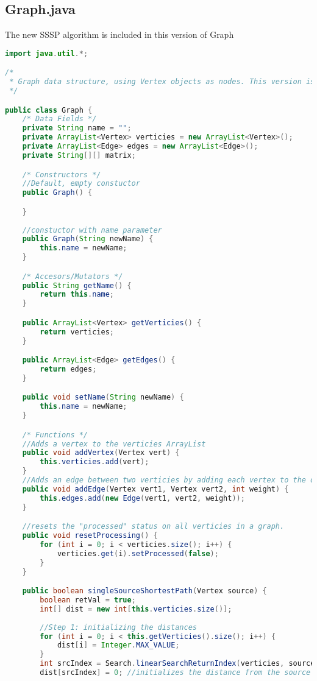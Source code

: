 \documentclass[letterpaper, 10pt,DIV=13]{scrartcl}
\numberwithin{equation}{section} %
\numberwithin{figure}{section} %
\numberwithin{table}{section} %
\begin{document}
\subsection{Graph.java}
The new SSSP algorithm is included in this version of Graph
\begin{lstlisting}[frame=single, language=java, breaklines]  
import java.util.*;

/*
 * Graph data structure, using Vertex objects as nodes. This version is for directed graphs
 */

public class Graph {
    /* Data Fields */
    private String name = "";
    private ArrayList<Vertex> verticies = new ArrayList<Vertex>();
    private ArrayList<Edge> edges = new ArrayList<Edge>();
    private String[][] matrix;

    /* Constructors */
    //Default, empty constuctor
    public Graph() {

    }
    
    //constuctor with name parameter
    public Graph(String newName) {
        this.name = newName;
    }

    /* Accesors/Mutators */
    public String getName() {
        return this.name;
    }

    public ArrayList<Vertex> getVerticies() {
        return verticies;
    }

    public ArrayList<Edge> getEdges() {
        return edges;
    }

    public void setName(String newName) {
        this.name = newName;
    }

    /* Functions */
    //Adds a vertex to the verticies ArrayList
    public void addVertex(Vertex vert) {
        this.verticies.add(vert);
    }
    //Adds an edge between two verticies by adding each vertex to the other's list of neighbors
    public void addEdge(Vertex vert1, Vertex vert2, int weight) {
        this.edges.add(new Edge(vert1, vert2, weight));
    }

    //resets the "processed" status on all verticies in a graph.
    public void resetProcessing() {
        for (int i = 0; i < verticies.size(); i++) {
            verticies.get(i).setProcessed(false);
        }
    }

    public boolean singleSourceShortestPath(Vertex source) {
        boolean retVal = true;
        int[] dist = new int[this.verticies.size()];
        
        //Step 1: initializing the distances
        for (int i = 0; i < this.getVerticies().size(); i++) {
            dist[i] = Integer.MAX_VALUE;
        }
        int srcIndex = Search.linearSearchReturnIndex(verticies, source.getId()); //finds the index of the source vertex in verticies
        dist[srcIndex] = 0; //initializes the distance from the source vertex to the source vertex as 0



\end{lstlisting}
\end{document}
